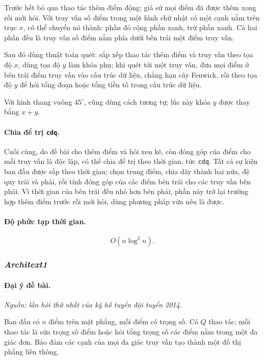 \documentclass[11pt]{article}
\begin{document}
Trước hết bỏ qua thao tác thêm điểm động; giả sử mọi điểm đã được thêm xong rồi
mới hỏi. Với truy vấn số điểm trong một hình chữ nhật có một cạnh nằm trên trục
\(x\), có thể chuyển nó thành: phần đỏ cộng phần xanh, trừ phần xanh. Cả hai
phần đều là truy vấn số điểm nằm phía dưới bên trái một điểm truy vấn.

Sau đó dùng thuật toán quét: sắp xếp thao tác thêm điểm và truy vấn theo tọa độ
\(x\), dùng tọa độ \(y\) làm khóa phụ; khi quét tới một truy vấn, đưa mọi điểm ở
bên trái điểm truy vấn vào cấu trúc dữ liệu, chẳng hạn cây Fenwick, rồi theo tọa
độ \(y\) để hỏi tổng đoạn hoặc tổng tiền tố trong cấu trúc dữ liệu.

Với hình thang vuông \(45^\circ\), cũng dùng cách tương tự; lúc này khóa \(y\)
được thay bằng \(x+y\).

\paragraph{Chia để trị \texttt{cdq}.}
Cuối cùng, do đề bài cho thêm điểm và hỏi xen kẽ, còn đóng góp của điểm cho mỗi
truy vấn là độc lập, có thể chia để trị theo thời gian, tức \texttt{cdq}. Tất cả
sự kiện ban đầu được sắp theo thời gian; chọn trung điểm, chia dãy thành hai
nửa, đệ quy trái và phải, rồi tính đóng góp của các điểm bên trái cho các truy
vấn bên phải. Vì thời gian của bên trái đều nhỏ hơn bên phải, phần này trở lại
trường hợp thêm điểm trước rồi mới hỏi, dùng phương pháp vừa nêu là được.

\paragraph{Độ phức tạp thời gian.}
\[
  O(n\log^2 n).
\]

\subsubsection{\emph{Architext1}}

\paragraph{Đại ý đề bài.}
\emph{Nguồn: lần hỏi thứ nhất của kỳ hỗ tuyển đội tuyển 2014.}

Ban đầu có \(n\) điểm trên mặt phẳng, mỗi điểm có trọng số. Có \(Q\) thao tác;
mỗi thao tác là sửa trọng số điểm hoặc hỏi tổng trọng số các điểm nằm trong một
đa giác đơn. Bảo đảm các cạnh của mọi đa giác truy vấn tạo thành một đồ thị
phẳng liên thông.
\end{document}
